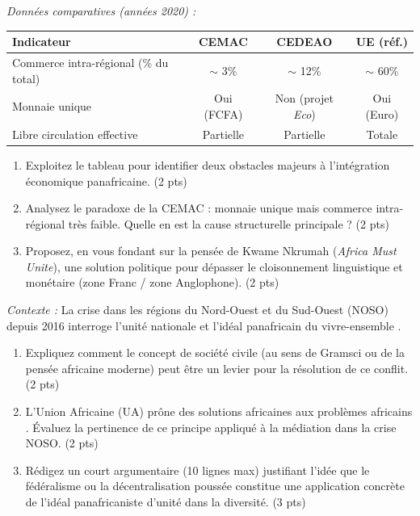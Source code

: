 \documentclass[11pt]{article}
\begin{document}
\begin{exercice}
    \textit{Données comparatives (années 2020) :}
    \begin{center}
    \begin{tabular}{|l|c|c|c|}
    \hline
    \textbf{Indicateur} & \textbf{CEMAC} & \textbf{CEDEAO} & \textbf{UE (réf.)} \\
    \hline
    Commerce intra-régional (\% du total) & $\sim$ 3\% & $\sim$ 12\% & $\sim$ 60\% \\
    \hline
    Monnaie unique & Oui (FCFA) & Non (projet \textit{Eco}) & Oui (Euro) \\
    \hline
    Libre circulation effective & Partielle & Partielle & Totale \\
    \hline
    \end{tabular}
    \end{center}
    \begin{enumerate}
        \item Exploitez le tableau pour identifier deux obstacles majeurs à l'intégration économique panafricaine. (2 pts)
        \item Analysez le paradoxe de la CEMAC : monnaie unique mais commerce intra-régional très faible. Quelle en est la cause structurelle principale ? (2 pts)
        \item Proposez, en vous fondant sur la pensée de Kwame Nkrumah (\textit{Africa Must Unite}), une solution politique pour dépasser le cloisonnement linguistique et monétaire (zone Franc / zone Anglophone). (2 pts)
    \end{enumerate}
\end{exercice}

\begin{exercice}
    \textit{Contexte :} La crise dans les régions du Nord-Ouest et du Sud-Ouest (NOSO) depuis 2016 interroge l'unité nationale et l'idéal panafricain du \og vivre-ensemble \fg.
    \begin{enumerate}
        \item Expliquez comment le concept de \og société civile \fg{} (au sens de Gramsci ou de la pensée africaine moderne) peut être un levier pour la résolution de ce conflit. (2 pts)
        \item L'Union Africaine (UA) prône des \og solutions africaines aux problèmes africains \fg{}. Évaluez la pertinence de ce principe appliqué à la médiation dans la crise NOSO. (2 pts)
        \item Rédigez un court argumentaire (10 lignes max) justifiant l'idée que le fédéralisme ou la décentralisation poussée constitue une application concrète de l'idéal panafricaniste d'unité dans la diversité. (3 pts)
    \end{enumerate}
\end{exercice}
\end{document}
